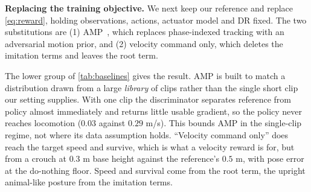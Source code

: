 \documentclass[letterpaper, 10 pt, conference]{ieeeconf}
\newcommand{\draft}[1]{}
\newcommand{\aref}[1]{~\hyperref[#1]{App.~\ref*{#1}}}
\newcommand{\aref}[1]{}
\begin{document}
\draft{
Two rows cannot be reduced to a single substitution. We mark them and say what they do and do not license, rather than read them as head-to-head results.
Two findings then separate. The reconstruction's own geometry can be measured without our retargeter. It holds the rigid axis, \autoref{subsec:exp-minimal}, but its articulation is damped, with a fore-aft foot sweep of $0.17$ stance lengths against $0.80$ for ours, and the unrefined reference trains to a policy that stands rather than locomotes. The downstream policy numbers cannot be measured that way. Our conversion leaves an IK residual of $19-26$ cm where our own references leave zero, so the remaining gap in \autoref{tab:baselines} belongs to the reconstruction and to our conversion together. These rows are evidence on cost and per-clip feasibility, not a fidelity verdict on learned reconstruction.
}

\textbf{Replacing the training objective.}
We next keep our reference and replace \autoref{eq:reward}, holding observations, actions, actuator model and DR fixed. The two substitutions are
(1) AMP~\cite{peng2021amp}, which replaces phase-indexed tracking with an adversarial motion prior, and
(2) velocity command only, which deletes the imitation terms and leaves the root term.

The lower group of \autoref{tab:baselines} gives the result. AMP is built to match a distribution drawn from a large \textit{library} of clips rather than the single short clip our setting supplies. With one clip the discriminator separates reference from policy almost immediately and returns little usable gradient, so the policy never reaches locomotion ($0.03$ against $0.29$ m/s). This bounds AMP in the single-clip regime, not where its data assumption holds. ``Velocity command only'' does reach the target speed and survive, which is what a velocity reward is for, but from a crouch at $0.3$ m base height against the reference's $0.5$ m, with pose error at the do-nothing floor. Speed and survival come from the root term, the upright animal-like posture from the imitation terms.


\end{document}
